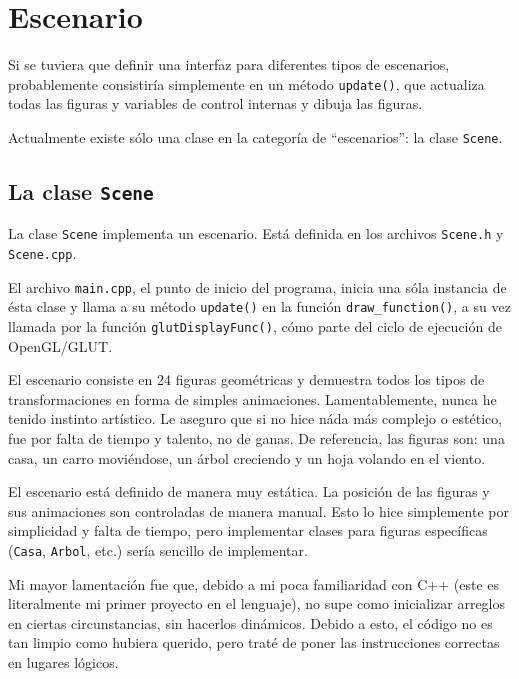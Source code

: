 \section{Escenario}
\label{escenario}

Si se tuviera que definir una interfaz para diferentes tipos de escenarios, probablemente
consistiría simplemente en un método \lstinline!update()!, que actualiza todas las
figuras y variables de control internas y dibuja las figuras.

Actualmente existe sólo una clase en la categoría de ``escenarios'': la clase
\lstinline!Scene!.

\subsection{La clase \lstinline!Scene!}

La clase \lstinline!Scene! implementa un escenario. Está definida en los archivos
\lstinline!Scene.h! y \lstinline!Scene.cpp!.

El archivo \lstinline!main.cpp!, el punto de inicio del programa, inicia una sóla
instancia de ésta clase y llama a su método \lstinline!update()! en la función
\lstinline!draw_function()!, a su vez llamada por la función \lstinline!glutDisplayFunc()!,
cómo parte del ciclo de ejecución de OpenGL/GLUT.

El escenario consiste en 24 figuras geométricas y demuestra todos los tipos de transformaciones
en forma de simples animaciones.
Lamentablemente, nunca he tenido instinto artístico. Le aseguro que si no hice náda
más complejo o estético, fue por falta de tiempo y talento, no de ganas.
De referencia, las figuras son: una casa, un carro moviéndose, un árbol creciendo
y un hoja volando en el viento.

El escenario está definido de manera muy estática. La posición de las figuras y sus
animaciones son controladas de manera manual. Esto lo hice simplemente por simplicidad
y falta de tiempo, pero implementar clases para figuras específicas (\lstinline!Casa!, \lstinline!Arbol!,
etc.) sería sencillo de implementar.

Mi mayor lamentación fue que, debido a mi poca familiaridad con C++ (este es literalmente
mi primer proyecto en el lenguaje), no supe como inicializar arreglos en ciertas
circunstancias, sin hacerlos dinámicos. Debido a esto, el código no es tan limpio
como hubiera querido, pero traté de poner las instrucciones correctas en lugares lógicos.